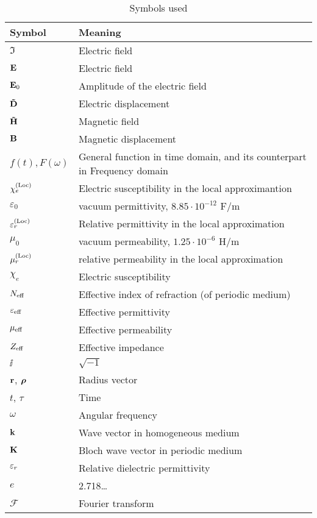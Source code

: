 \begin{table}[ht]   \caption{Symbols used}  \label{tb_symbols} \centering %
\begin{tabular}{ll}
 \toprule
Symbol & Meaning	\\
 \hline
$\Im$ 		& Electric field\\
$\mathbf{E}$ 		& Electric field\\
$\mathbf{E}_0$ 		& Amplitude of the electric field\\
$\mathbf{\tilde{D}}$ 		& Electric displacement\\
$\mathbf{\tilde{H}}$ 		& Magnetic field\\
$\mathbf{B}$ 		& Magnetic displacement\\
$f(t), F(\omega)$ & General function in time domain, and its counterpart in Frequency domain \\
$\chi_e^{\rm(Loc)}$ & Electric susceptibility in the local approximantion \\
$\varepsilon_0$ &vacuum permittivity, $8.85\cdot10^{-12}$ F/m\\
$\varepsilon^{\rm(Loc)}_r$ &Relative permittivity in the local approximation\\
$\mu_0$		&vacuum permeability, $1.25\cdot10^{-6}$ H/m \\
$\mu^{\rm(Loc)}_r$ &relative permeability in the local approximation\\
$\chi_e$ 	& Electric susceptibility\\
$N_{\text{eff} }$ 	& Effective index of refraction (of periodic medium)\\
$\varepsilon_{\text{eff} }$ 	& Effective permittivity\\
$\mu_{\text{eff} }$ 	& Effective permeability\\
$Z_{\text{eff} }$ 	& Effective impedance\\
$\ii$		& $\sqrt{-1}$\\
${\mathbf{r}}$, $\boldsymbol{\rho}$ 		& Radius vector\\
$t$, $\tau$ 		& Time\\
$\omega$ 	& Angular frequency\\
${\mathbf{k}}$ 		& Wave vector in homogeneous medium\\
${\mathbf{K}}$ 		& Bloch wave vector in periodic medium\\
${\varepsilon_r}$ 	& Relative dielectric permittivity\\
$e$ 		& 2.718\ldots\\
$\mathcal F$ 		& Fourier transform\\
 \bottomrule
 \end{tabular} \end{table}

